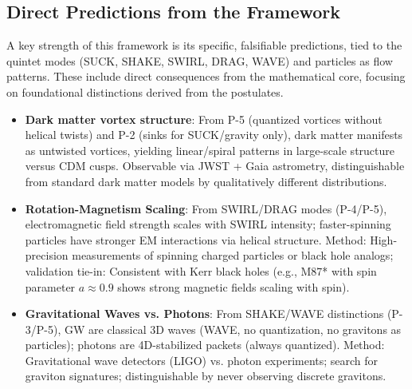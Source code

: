 \medskip

\subsection{Direct Predictions from the Framework}

A key strength of this framework is its specific, falsifiable predictions, tied to the quintet modes (SUCK, SHAKE, SWIRL, DRAG, WAVE) and particles as flow patterns. These include direct consequences from the mathematical core, focusing on foundational distinctions derived from the postulates.

\begin{itemize}
\item \textbf{Dark matter vortex structure}: From P-5 (quantized vortices without helical twists) and P-2 (sinks for SUCK/gravity only), dark matter manifests as untwisted vortices, yielding linear/spiral patterns in large-scale structure versus CDM cusps. Observable via JWST + Gaia astrometry, distinguishable from standard dark matter models by qualitatively different distributions.
\item \textbf{Rotation-Magnetism Scaling}: From SWIRL/DRAG modes (P-4/P-5), electromagnetic field strength scales with SWIRL intensity; faster-spinning particles have stronger EM interactions via helical structure. Method: High-precision measurements of spinning charged particles or black hole analogs; validation tie-in: Consistent with Kerr black holes (e.g., M87* with spin parameter $a \approx 0.9$ shows strong magnetic fields scaling with spin).
\item \textbf{Gravitational Waves vs. Photons}: From SHAKE/WAVE distinctions (P-3/P-5), GW are classical 3D waves (WAVE, no quantization, no gravitons as particles); photons are 4D-stabilized packets (always quantized). Method: Gravitational wave detectors (LIGO) vs. photon experiments; search for graviton signatures; distinguishable by never observing discrete gravitons.
\end{itemize}

